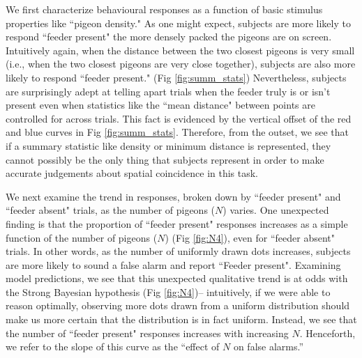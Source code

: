 \documentclass{article}
\begin{document}
We first characterize behavioural responses as a function of basic stimulus properties like ``pigeon density." As one might expect, subjects are more likely to respond ``feeder present" the more densely packed the pigeons are on screen. Intuitively again, when the distance between the two closest pigeons is very small (i.e., when the two closest pigeons are very close together), subjects are also more likely to respond ``feeder present." (Fig \ref{fig:summ_stats}) Nevertheless, subjects are surprisingly adept at telling apart trials when the feeder truly is or isn't present even when statistics like the ``mean distance" between points are controlled for across trials. This fact is evidenced by the vertical offset of the red and blue curves in Fig \ref{fig:summ_stats}. Therefore, from the outset, we see that if a summary statistic like density or minimum distance is represented, they cannot possibly be the only thing that subjects represent in order to make accurate judgements about spatial coincidence in this task.

We next examine the trend in responses, broken down by ``feeder present" and ``feeder absent" trials, as the number of pigeons ($N$) varies. One unexpected finding is that the proportion of ``feeder present" responses increases as a simple function of the number of pigeons ($N$) (Fig \ref{fig:N4}), even for ``feeder absent" trials. In other words, as the number of uniformly drawn dots increases, subjects are more likely to sound a false alarm and report ``Feeder present". Examining model predictions, we see that this unexpected qualitative trend is at odds with the Strong Bayesian hypothesis (Fig \ref{fig:N4})-- intuitively, if we were able to reason optimally, observing more dots drawn from a uniform distribution should make us more certain that the distribution is in fact uniform. Instead, we see that the number of ``feeder present" responses increases with increasing $N$. %
Henceforth, we refer to the slope of this curve as the ``effect of $N$ on false alarms.” 
\end{document}
